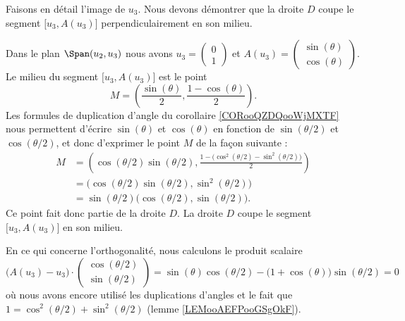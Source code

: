 \begin{subproof}
    Faisons en détail l'image de \( u_3\). Nous devons démontrer que la droite \( D\) coupe le segment \( \mathopen[ u_3 , A(u_3) \mathclose]\) perpendiculairement en son milieu.
    
    Dans le plan \( \Span(u_2,u_3)\) nous avons \( u_3=\begin{pmatrix}
        0    \\ 
        1    
    \end{pmatrix}\) et \( A(u_3)=\begin{pmatrix}
        \sin(\theta)    \\ 
        \cos(\theta)    
    \end{pmatrix}\). Le milieu du segment \( \mathopen[ u_3 , A(u_3) \mathclose]\) est le point
    \begin{equation}
        M=\left( \frac{ \sin(\theta) }{2},\frac{ 1-\cos(\theta) }{2} \right).
    \end{equation}
    Les formules de duplication d'angle du corollaire \ref{CORooQZDQooWjMXTF} nous permettent d'écrire \( \sin(\theta)\) et \( \cos(\theta)\) en fonction de \( \sin(\theta/2)\) et \( \cos(\theta/2)\), et donc d'exprimer le point \( M\) de la façon suivante :
    \begin{subequations}
        \begin{align}
            M&=\left( \cos(\theta/2)\sin(\theta/2),\frac{ 1-\big( \cos^2(\theta/2)-\sin^2(\theta/2) \big) }{2} \right)\\
            &=\big( \cos(\theta/2)\sin(\theta/2),\sin^2(\theta/2) \big)\\
            &=\sin(\theta/2)\big( \cos(\theta/2),\sin(\theta/2) \big).
        \end{align}
    \end{subequations}
    Ce point fait donc partie de la droite \( D\). La droite \( D\) coupe le segment \( \mathopen[ u_3 , A(u_3) \mathclose]\) en son milieu.

    En ce qui concerne l'orthogonalité, nous calculons le produit scalaire
    \begin{equation}
            \big( A(u_3)-u_3 \big)\cdot\begin{pmatrix}
                \cos(\theta/2)    \\ 
                \sin(\theta/2)    
            \end{pmatrix}
            =\sin(\theta)\cos(\theta/2)-\big( 1+\cos(\theta) \big)\sin(\theta/2)=0
    \end{equation}
    où nous avons encore utilisé les duplications d'angles et le fait que \( 1=\cos^2(\theta/2)+\sin^2(\theta/2)\) (lemme \ref{LEMooAEFPooGSgOkF}).


\end{subproof}
